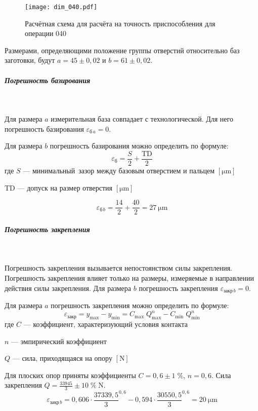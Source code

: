 \documentclass[14pt,russian,a4paper]{extreport}
\begin{document}
\begin{figure}[H]
	\centering
	   \texttt{[image: dim\_040.pdf]}
	   \caption{Расчётная схема для расчёта на точность приспособления для операции 040}
	   \label{fig:d040}
\end{figure}

Размерами, определяющими положение группы отверстий относительно баз заготовки, будут $ a = 45 \pm 0,02 $ и $ b = 61 \pm 0,02 $.

\subparagraph{Погрешность базирования} \

Для размера $a$ измерительная база совпадает с технологической. Для него погрешность базирования $ \varepsilon_{\text{б} \, a} = 0 $.

Для размера $b$ погрешность базирования можно определить по формуле: \cite[с.~60]{tarabarin:pto}
\begin{equation}
  \varepsilon_{\text{б}} = \frac{S}{2} + \frac{\text{TD}}{2}
\end{equation}
где $S$ --- минимальный зазор между базовым отверстием и пальцем $\left[\si{\micro\meter}\right]$ \par
$\text{TD}$ --- допуск на размер отверстия $\left[\si{\micro\meter}\right]$

\begin{equation*}
  \varepsilon_{\text{б} \, b} = \frac{14}{2} + \frac{40}{2} = \SI{27}{\micro\meter}
\end{equation*}

\subparagraph{Погрешность закрепления} \

Погрешность закрепления вызывается непостоянством силы закрепления. Погрешность закрепления влияет только на размеры, измеряемые в направлении действия силы закрепления. Для размера $b$ погрешность закрепления $ \varepsilon_{\text{закр} \, b} = 0 $.

Для размера $a$ погрешность закрепления можно определить по формуле: \cite[с.~64]{tarabarin:pto}
\begin{equation}
  \varepsilon_{\text{закр}} = y_\text{max} - y_\text{min} = C_\text{max} \; Q_\text{max}^n - C_\text{min} \; Q_\text{min}^n
\end{equation}
где $C$ --- коэффициент, характеризующий условия контакта \par
$n$ --- эмпирический коэффициент \par
$Q$ --- сила, приходящаяся на опору $\left[\si{\newton}\right]$

Для плоских опор приняты коэффициенты $ C = 0,6 \pm 1 \; \% $, $ n = 0,6 $. Сила закрепления $ Q = \frac{33945}{3} \pm 10 \; \% \; \si{\newton} $. 
\begin{equation*}
  \varepsilon_{\text{закр} \, b} = 0,606 \cdot \frac{37339,5}{3}^{0,6} - 0,594 \cdot \frac{30550,5}{3}^{0,6} = \SI{20}{\micro\meter}
\end{equation*}
\end{document}
